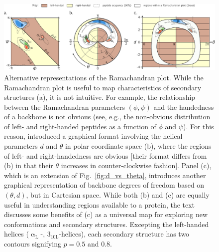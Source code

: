 \documentclass[fleqn,10pt,lineno]{wlpeerj} %
\newcommand{\n}[1]{{\color{blue}#1}}
\newcommand{\Fig}[1]{Fig.~\ref{#1}}
\begin{document}
\begin{figure}[t!]
\begin{adjustwidth}{-1in}{0in} %
\centering
\includegraphics[width=1.0\linewidth]{./figures/various_2d_distributions.pdf}
\caption{\label{fig:alternatives} 
\n{Alternative representations of the Ramachandran plot. While the Ramachandran plot is useful to map characteristics of secondary structures (a), it is not intuitive. For example, the relationship between the Ramachandran parameters $(\phi,\psi)$ and the handedness of a backbone is not obvious (see, e.g., the non-obvious distribution of left- and right-handed peptides as a function of $\phi$ and $\psi$). For this reason, \cite{Zacharias2013} introduced a graphical format involving the helical parameters $d$ and $\theta$ in polar coordinate space (b), where the regions of left- and right-handedness are obvious [their format differs from (b) in that their $\theta$ increases in counter-clockwise fashion]. Panel (c), which is an extension of \Fig{fig:d_vs_theta}, introduces another graphical representation of backbone degrees of freedom based on $(\theta,d)$, but  in Cartesian space. While both (b) and (c) are equally useful in understanding regions available to a protein, the text discusses some benefits of (c) as a universal map for exploring new conformations and secondary structures. Excepting the left-handed helices ($\upalpha_\textrm{L}$-, $3_\textrm{10L}$-helices), each secondary structure has two contours signifying $p=0.5$ and $0.8$.
} 
}
\end{adjustwidth}
\end{figure}
\end{document}
